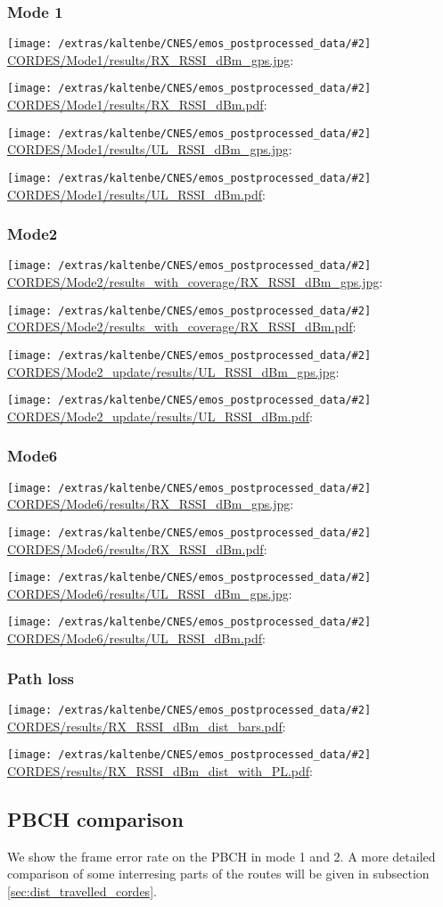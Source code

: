 \documentclass[a4paper,10pt]{article}
\newcommand{\printfile}[2][]{
 \begin{minipage}{8cm}
  \centering
  \texttt{[image: /extras/kaltenbe/CNES/emos\_postprocessed\_data/\#2]}
  \url{#2}: #1

 \end{minipage}
}
\begin{document}
%  

\subsubsection{Mode 1}
\printfile{CORDES/Mode1/results/RX_RSSI_dBm_gps.jpg}
\printfile{CORDES/Mode1/results/RX_RSSI_dBm.pdf}

\printfile{CORDES/Mode1/results/UL_RSSI_dBm_gps.jpg}
\printfile{CORDES/Mode1/results/UL_RSSI_dBm.pdf}

\subsubsection{Mode2}

\printfile{CORDES/Mode2/results_with_coverage/RX_RSSI_dBm_gps.jpg}
\printfile{CORDES/Mode2/results_with_coverage/RX_RSSI_dBm.pdf}

\printfile{CORDES/Mode2_update/results/UL_RSSI_dBm_gps.jpg}
\printfile{CORDES/Mode2_update/results/UL_RSSI_dBm.pdf}

\subsubsection{Mode6}
\printfile{CORDES/Mode6/results/RX_RSSI_dBm_gps.jpg}
\printfile{CORDES/Mode6/results/RX_RSSI_dBm.pdf}

\printfile{CORDES/Mode6/results/UL_RSSI_dBm_gps.jpg}
\printfile{CORDES/Mode6/results/UL_RSSI_dBm.pdf}

\subsubsection{Path loss}
\printfile{CORDES/results/RX_RSSI_dBm_dist_bars.pdf}
\printfile{CORDES/results/RX_RSSI_dBm_dist_with_PL.pdf}


\subsection{PBCH comparison}
We show the frame error rate on the PBCH in mode 1 and 2. A more detailed comparison of some interresing parts of the routes will be given in subsection \ref{sec:dist_travelled_cordes}.
\end{document}
